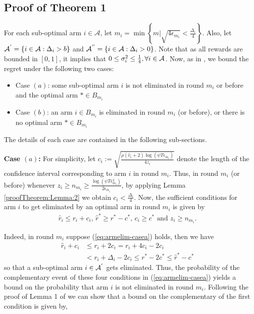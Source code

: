 \subsection*{Proof of Theorem 1}
\label{sec:proofTheorem:Theorem1}
\begin{customproof}{1}
For each sub-optimal arm ${i}\in\mathcal{A}$, let $m_{i}=\min{\left\lbrace m|\sqrt{4\epsilon_{m_i}} < \frac{\Delta_{i}}{4}\right\rbrace}$. Also, let $\mathcal{A}^{'}=\lbrace i\in \mathcal{A}: \Delta_{i} > b \rbrace$ and $\mathcal{A}^{''}=\lbrace i\in \mathcal{A}: \Delta_{i} > 0 \rbrace$. Note that as all rewards are bounded in $[0,1]$, it implies that $0\leq \sigma_i^2 \leq \frac{1}{4},\forall i\in \mathcal{A}$. Now, as in \citet{auer2010ucb}, we bound the regret under the following two cases: 
\begin{itemize}
\item {Case $(a)$}: some sub-optimal arm ${i}$ is not eliminated in round $m_{i}$ or before and the optimal arm ${*}\in B_{m_{i}}$
\item {Case $(b)$}: an arm ${i}\in B_{m_i}$ is eliminated in round $m_{i}$ (or before), or there is no optimal arm $*\in B_{m_i}$
\end{itemize} 
The details of each case are contained in the following sub-sections.


\textbf{Case $(a)$:}
For simplicity, let $c_{i} := \sqrt{\frac{\rho (\hat{v}_i + 2) \log (\psi T\epsilon_{m_{i}})}{4 z_{i}}}$ denote the length of the confidence interval corresponding to arm $i$ in round $m_i$. Thus, in round $m_i$ (or before) whenever $z_i \geq n_{m_{i}}\ge\frac{\log{(\psi T\epsilon_{m_{i}}^{2})}}{2\epsilon_{m_{i}}}$, by applying Lemma \ref{proofTheorem:Lemma:2} we obtain $c_{i} < \frac{\Delta_{i}}{4}$.
Now, the sufficient conditions for arm $i$ to get eliminated by an optimal arm in round $m_i$ is given by
	\begin{eqnarray}
	\hat{r}_{i} \leq r_{i} + c_{i} \text{, } 
 	\hat{r}^{*} \geq r^{*} - c^{*} \text{, } c_{i} \geq c^* \text{ and } z_i \geq n_{m_i} \label{eq:armelim-casea}.
	\end{eqnarray}

Indeed, in round $m_i$ suppose (\ref{eq:armelim-casea}) holds, then we have
%	 
  \begin{align*}
\hat{r}_{i} + c_{i}&\leq r_{i} + 2c_{i} 
= r_{i} + 4c_{i} - 2c_{i} \\
 &< r_{i} + \Delta_{i} - 2c_{i}
 \leq r^{*} -2c^{*} 
 \leq \hat{r}^{*} - c^{*}
  \end{align*}
  so that a sub-optimal arm ${i} \in \mathcal{A}^{'}$ gets eliminated.	
Thus, the probability of the complementary event of these four conditions in (\ref{eq:armelim-casea}) yields a bound on the probability that arm $i$ is not eliminated in round $m_i$. Following the proof of Lemma 1 of \citet{audibert2009exploration} we can show that a bound on the complementary of the first condition is given by,


\end{customproof}

